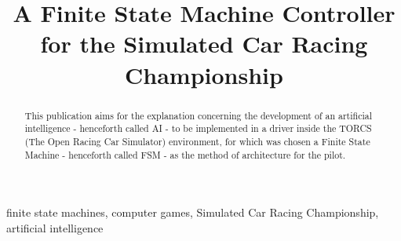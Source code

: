\documentclass[journal]{IEEEtran}%
\begin{document}
	\title{A Finite State Machine Controller for the Simulated Car Racing Championship}

\author{
	}

%
{}%

\maketitle

\begin{abstract}
This publication aims for the explanation concerning the development of an artificial intelligence - henceforth called AI - to be implemented in a driver inside the TORCS (The Open Racing Car Simulator) environment, for which was chosen a Finite State Machine - henceforth called FSM - as the method of architecture for the pilot.
\end{abstract}

\begin{IEEEkeywords}
finite state machines, computer games, Simulated Car Racing Championship, artificial intelligence
\end{IEEEkeywords}%


%
%
\end{document}
